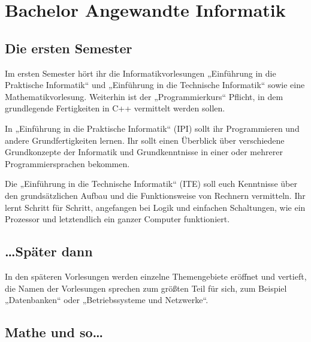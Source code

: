 \section{Bachelor Angewandte Informatik}

\subsection{Die ersten Semester}

Im ersten Semester hört ihr die Informatikvorlesungen „Einführung in die Praktische Informatik“ und „Einführung in die Technische Informatik“ sowie eine Mathematikvorlesung. Weiterhin ist der „Programmierkurs“ Pflicht, in dem grundlegende Fertigkeiten in C++ vermittelt werden sollen.

In „Einführung in die Praktische Informatik“ (IPI) sollt ihr Programmieren und andere Grundfertigkeiten lernen. Ihr sollt einen Überblick über verschiedene Grundkonzepte der Informatik und Grundkenntnisse in einer oder mehrerer Programmiersprachen bekommen.

Die „Einführung in die Technische Informatik“ (ITE) soll euch Kenntnisse über den grundsätzlichen Aufbau und die Funktionsweise von Rechnern vermitteln. Ihr lernt Schritt für Schritt, angefangen bei Logik und einfachen Schaltungen, wie ein Prozessor und letztendlich ein ganzer Computer funktioniert.


\subsection{\dots{}Später dann}

In den späteren Vorlesungen werden einzelne Themengebiete eröffnet und vertieft, die Namen der Vorlesungen sprechen zum größten Teil für sich, zum Beispiel „Datenbanken“ oder „Betriebssysteme und Netzwerke“.


\subsection{Mathe und so\dots}

